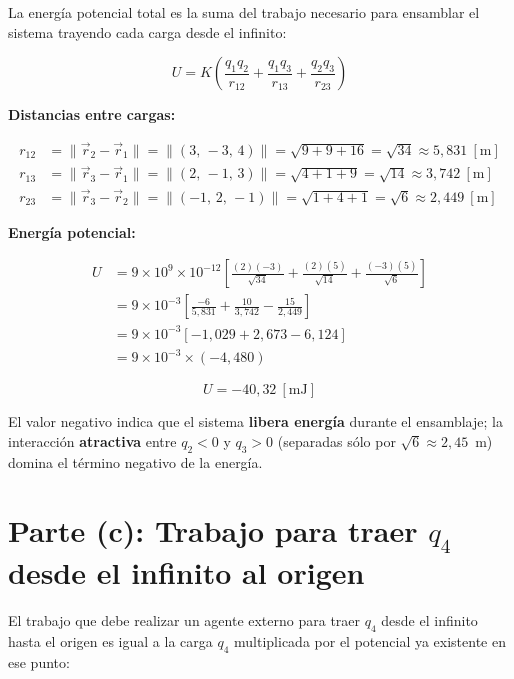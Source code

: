\documentclass[12pt,letterpaper]{article}
\begin{document}
La energ\'ia potencial total es la suma del trabajo necesario para ensamblar el sistema trayendo cada carga desde el infinito:

\[
    U = K\left(\frac{q_1 q_2}{r_{12}} + \frac{q_1 q_3}{r_{13}} + \frac{q_2 q_3}{r_{23}}\right)
\]

\noindent\textbf{Distancias entre cargas:}

\begin{align*}
    r_{12} &= \|\vec{r}_2 - \vec{r}_1\|
            = \|(3,\,-3,\,4)\|
            = \sqrt{9+9+16} = \sqrt{34} \approx 5{,}831\ [\text{m}]\\[4pt]
    r_{13} &= \|\vec{r}_3 - \vec{r}_1\|
            = \|(2,\,-1,\,3)\|
            = \sqrt{4+1+9} = \sqrt{14} \approx 3{,}742\ [\text{m}]\\[4pt]
    r_{23} &= \|\vec{r}_3 - \vec{r}_2\|
            = \|(-1,\,2,\,-1)\|
            = \sqrt{1+4+1} = \sqrt{6} \approx 2{,}449\ [\text{m}]
\end{align*}

\noindent\textbf{Energ\'ia potencial:}

\begin{align*}
    U &= 9\times10^{9} \times 10^{-12}\left[\frac{(2)(-3)}{\sqrt{34}} + \frac{(2)(5)}{\sqrt{14}} + \frac{(-3)(5)}{\sqrt{6}}\right]\\[6pt]
      &= 9\times10^{-3}\left[\frac{-6}{5{,}831} + \frac{10}{3{,}742} - \frac{15}{2{,}449}\right]\\[6pt]
      &= 9\times10^{-3}\left[-1{,}029 + 2{,}673 - 6{,}124\right]\\[6pt]
      &= 9\times10^{-3} \times (-4{,}480)
\end{align*}

\[
    \boxed{U = -40{,}32\ [\text{mJ}]}
\]

\noindent El valor negativo indica que el sistema \textbf{libera energ\'ia} durante el ensamblaje; la interacci\'on \textbf{atractiva} entre $q_2 < 0$ y $q_3 > 0$ (separadas s\'olo por $\sqrt{6}\approx 2{,}45$~m) domina el t\'ermino negativo de la energ\'ia.

\section*{Parte (c): Trabajo para traer $q_4$ desde el infinito al origen}

El trabajo que debe realizar un agente externo para traer $q_4$ desde el infinito hasta el origen es igual a la carga $q_4$ multiplicada por el potencial ya existente en ese punto:
\end{document}
